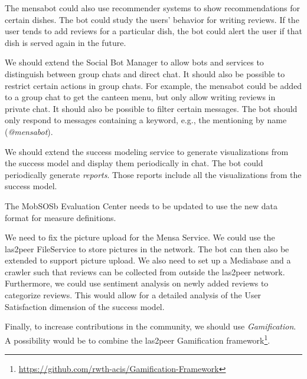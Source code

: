 The mensabot could also use recommender systems to show recommendations for certain dishes. The bot could study the users' behavior for writing reviews. If the user tends to add reviews for a particular dish, the bot could alert the user if that dish is served again in the future.

We should extend the Social Bot Manager to allow bots and services to distinguish between group chats and direct chat. It should also be possible to restrict certain actions in group chats. For example, the mensabot could be added to a group chat to get the canteen menu, but only allow writing reviews in private chat.
It should also be possible to filter certain messages. The bot should only respond to messages containing a keyword, e.g., the mentioning by name (\emph{@mensabot}).

We should extend the success modeling service to generate visualizations from the success model and display them periodically in chat. The bot could periodically generate \emph{reports}. Those reports include all the visualizations from the success model. 

The MobSOSb Evaluation Center needs to be updated to use the new data format for measure definitions.

We need to fix the picture upload for the Mensa Service. We could use the las2peer FileService to store pictures in the network. The bot can then also be extended to support picture upload. 
We also need to set up a Mediabase and a crawler such that reviews can be collected from outside the las2peer network. 
Furthermore, we could use sentiment analysis on newly added reviews to categorize reviews. This would allow for a detailed analysis of the User Satisfaction dimension of the success model.

Finally, to increase contributions in the community, we should use \emph{Gamification}. A possibility would be to combine the las2peer Gamification framework\footnote{\url{https://github.com/rwth-acis/Gamification-Framework}}.